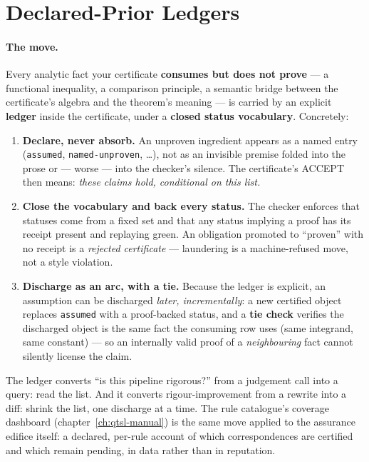 \section{Declared-Prior Ledgers}
\label{sec:ckbk-prior-ledgers}

\paragraph{The move.} Every analytic fact your certificate
\textbf{consumes but does not prove} --- a functional inequality, a
comparison principle, a semantic bridge between the certificate's
algebra and the theorem's meaning --- is carried by an explicit
\textbf{ledger} inside the certificate, under a \textbf{closed status
vocabulary}.
Concretely:

\begin{enumerate}
\item \textbf{Declare, never absorb.} An unproven ingredient appears as
  a named entry (\texttt{assumed}, \texttt{named-unproven}, \ldots),
  not as an invisible premise folded into the prose or --- worse ---
  into the checker's silence. The certificate's ACCEPT then
  means: \emph{these claims hold, conditional on this list.}
\item \textbf{Close the vocabulary and back every status.} The checker
  enforces that statuses come from a fixed set and that any status
  implying a proof has its receipt present and replaying green. An
  obligation promoted to ``proven'' with no receipt is a \emph{rejected
  certificate} --- laundering is a machine-refused move, not a style
  violation.
\item \textbf{Discharge as an arc, with a tie.} Because the ledger is
  explicit, an assumption can be discharged \emph{later,
  incrementally}: a new certified object replaces \texttt{assumed} with
  a proof-backed status, and a \textbf{tie check} verifies the
  discharged object is the same fact the consuming row uses (same
  integrand, same constant) --- so an internally valid proof of a
  \emph{neighbouring} fact cannot silently license the claim.
\end{enumerate}

The ledger converts ``is this pipeline rigorous?'' from a judgement call %
into a query: read the list. And it converts rigour-improvement from a
rewrite into a diff: shrink the list, one discharge at a time. The rule
catalogue's coverage dashboard (chapter~\ref{ch:qtsl-manual}) is the
same move applied to the assurance edifice itself: a declared,
per-rule account of which correspondences are certified and which
remain pending, in data rather than in reputation.


